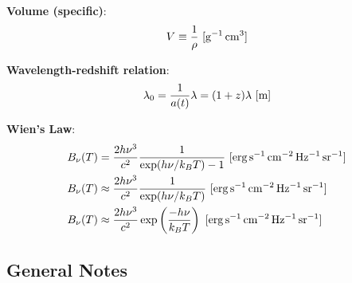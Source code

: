 \documentclass[a4paper,10pt]{article}
\begin{document}
{\noindent}\textbf{Volume (specific)}:
\begin{align*}
    V \equiv \frac{1}{\rho}~ [{\rm g^{-1}\,cm^3}]
\end{align*}

{\noindent}\textbf{Wavelength-redshift relation}:
\begin{align*}
    \lambda_0 = \frac{1}{a(t)}\lambda = (1+z)\lambda ~ [{\rm m}]
\end{align*}

{\noindent}\textbf{Wien's Law}:
\begin{align*}
    B_\nu(T) &= \frac{2h\nu^3}{c^2} \frac{1}{\exp(h\nu/k_BT) - 1} ~ [{\rm erg\,s^{-1}\,cm^{-2}\,Hz^{-1}\,sr^{-1}}] \\
    B_\nu(T) &\approx \frac{2h\nu^3}{c^2} \frac{1}{\exp(h\nu/k_BT)} ~ [{\rm erg\,s^{-1}\,cm^{-2}\,Hz^{-1}\,sr^{-1}}] \\
    B_\nu(T) &\approx \frac{2h\nu^3}{c^2} \exp\left(\frac{-h\nu}{k_BT}\right) ~ [{\rm erg\,s^{-1}\,cm^{-2}\,Hz^{-1}\,sr^{-1}}]
\end{align*}







































\newpage
\subsection{General Notes}
\end{document}
